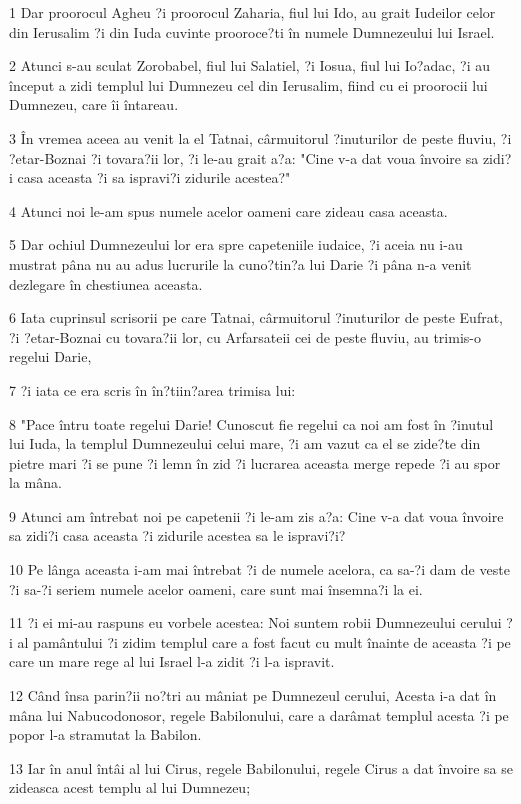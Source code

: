 \par 1 Dar proorocul Agheu ?i proorocul Zaharia, fiul lui Ido, au grait Iudeilor celor din Ierusalim ?i din Iuda cuvinte prooroce?ti în numele Dumnezeului lui Israel.
\par 2 Atunci s-au sculat Zorobabel, fiul lui Salatiel, ?i Iosua, fiul lui Io?adac, ?i au început a zidi templul lui Dumnezeu cel din Ierusalim, fiind cu ei proorocii lui Dumnezeu, care îi întareau.
\par 3 În vremea aceea au venit la el Tatnai, cârmuitorul ?inuturilor de peste fluviu, ?i ?etar-Boznai ?i tovara?ii lor, ?i le-au grait a?a: "Cine v-a dat voua învoire sa zidi?i casa aceasta ?i sa ispravi?i zidurile acestea?"
\par 4 Atunci noi le-am spus numele acelor oameni care zideau casa aceasta.
\par 5 Dar ochiul Dumnezeului lor era spre capeteniile iudaice, ?i aceia nu i-au mustrat pâna nu au adus lucrurile la cuno?tin?a lui Darie ?i pâna n-a venit dezlegare în chestiunea aceasta.
\par 6 Iata cuprinsul scrisorii pe care Tatnai, cârmuitorul ?inuturilor de peste Eufrat, ?i ?etar-Boznai cu tovara?ii lor, cu Arfarsateii cei de peste fluviu, au trimis-o regelui Darie,
\par 7 ?i iata ce era scris în în?tiin?area trimisa lui:
\par 8 "Pace întru toate regelui Darie! Cunoscut fie regelui ca noi am fost în ?inutul lui Iuda, la templul Dumnezeului celui mare, ?i am vazut ca el se zide?te din pietre mari ?i se pune ?i lemn în zid ?i lucrarea aceasta merge repede ?i au spor la mâna.
\par 9 Atunci am întrebat noi pe capetenii ?i le-am zis a?a: Cine v-a dat voua învoire sa zidi?i casa aceasta ?i zidurile acestea sa le ispravi?i?
\par 10 Pe lânga aceasta i-am mai întrebat ?i de numele acelora, ca sa-?i dam de veste ?i sa-?i seriem numele acelor oameni, care sunt mai însemna?i la ei.
\par 11 ?i ei mi-au raspuns eu vorbele acestea: Noi suntem robii Dumnezeului cerului ?i al pamântului ?i zidim templul care a fost facut cu mult înainte de aceasta ?i pe care un mare rege al lui Israel l-a zidit ?i l-a ispravit.
\par 12 Când însa parin?ii no?tri au mâniat pe Dumnezeul cerului, Acesta i-a dat în mâna lui Nabucodonosor, regele Babilonului, care a darâmat templul acesta ?i pe popor l-a stramutat la Babilon.
\par 13 Iar în anul întâi al lui Cirus, regele Babilonului, regele Cirus a dat învoire sa se zideasca acest templu al lui Dumnezeu;
